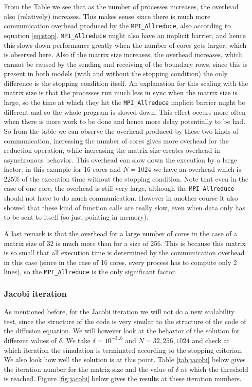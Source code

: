 \documentclass[11pt,a4paper,onecolumn]{article}
\begin{document}
From the Table we see that as the number of processes increases, the overhead also (relatively) increases. This makes sense since there is much more communication overhead produced by the \texttt{MPI\_Allreduce}, also according to equation \ref{eq:stop}. \texttt{MPI\_Allreduce} might also have an implicit barrier, and hence this slows down performance greatly when the number of cores gets larger, which is observed here. Also if the matrix size increases, the overhead increases, which cannot be caused by the sending and receiving of the boundary rows, since this is present in both models (with and without the stopping condition) the only difference is the stopping condition itself. An explanation for this scaling with the matrix size is that the processes run much less in sync when the matrix size is large, so the time at which they hit the \texttt{MPI\_Allreduce} implicit barrier might be different and so the whole program is slowed down. This effect occurs more often when there is more work to be done and hence more delay potentially to be had. So from the table we can observe the overhead produced by these two kinds of communication, increasing the number of cores gives more overhead for the reduction operation, while increasing the matrix size creates overhead in asynchronous behavior. This overhead can slow down the execution by a large factor, in this example for 16 cores and $N =1024$ we have an overhead which is 225\% of the execution time without the stopping condition. Note that even in the case of one core, the overhead is still very large, although the \texttt{MPI\_Allreduce} should not have to do much communication. However in another course it also showed that these kind of function calls are really slow, even when data only has to be sent to itself (so just pointing in memory). 

A last remark is that the overhead for a large number of cores in the case of a matrix size of 32 is much more than for a size of 256. This is because this matrix is so small that all execution time is determined by the communication overhead in this case (since in the case of 16 cores, every process has to compute only 2 lines), so the \texttt{MPI\_Allreduce} is the only significant factor.

\subsubsection{Jacobi iteration}
As mentioned before, for the Jacobi iteration we will not do a new scalability test, since the structure of the code is very similar to the structure of the code of the diffusion equation. We will however look at the behavior of the solution for different values of $\delta$. We take $\delta = 10^{-3..6}$ and $N = 32, 256, 1024$ and check at which iteration the simulation is terminated according to the stopping criterion. We also look how well the solution is at this point. Table \ref{tab:jacobi} below gives the iteration number for the matrix size and the value of $\delta$ at which the threshold is reached. Figure \ref{fig:jacobi} below gives the results at these iteration numbers.
\end{document}
